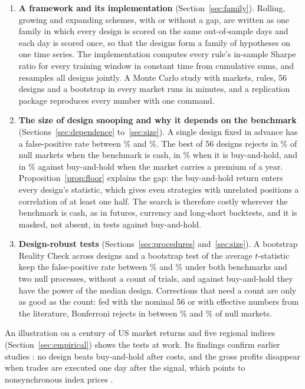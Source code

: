 \documentclass[pdflatex,sn-basic]{sn-jnl}
\theoremstyle{thmstyleone}
\theoremstyle{thmstylethree}
\begin{document}
\begin{enumerate}
\item \textbf{A framework and its implementation} (Section~\ref{sec:family}). Rolling, growing and
expanding schemes, with or without a gap, are written as one family in which every design is scored
on the same out-of-sample days and each day is scored once, so that the designs form a family of
hypotheses on one time series. The implementation computes every rule's in-sample Sharpe ratio for
every training window in constant time from cumulative sums, and resamples all designs jointly. A
Monte Carlo study with \NumNullReps{} markets, \NumRules{} rules, 56 designs and a bootstrap in
every market runs in minutes, and a replication package reproduces every number with one command.

\item \textbf{The size of design snooping and why it depends on the benchmark}
(Sections~\ref{sec:dependence} to~\ref{sec:size}). A single design fixed in advance has a
false-positive rate between \NumSizeSingleMin\% and \NumSizeSingleMax\%. The best of 56 designs
rejects in \NumSizeBestNaiveCash\% of null markets when the benchmark is cash, in
\NumSizeBestNaive\% when it is buy-and-hold, and in \NumSizeBestNaivePremium\% against buy-and-hold
when the market carries a premium of \NumPremium{} a year. Proposition~\ref{prop:floor} explains the
gap: the buy-and-hold return enters every design's statistic, which gives even
strategies with unrelated positions a correlation of at least one half. The search is therefore
costly wherever the benchmark is cash, as in futures, currency and long-short backtests, and it is
masked, not absent, in tests against buy-and-hold.

\item \textbf{Design-robust tests} (Sections~\ref{sec:procedures} and~\ref{sec:size}). A bootstrap
Reality Check across designs and a bootstrap test of the average $t$-statistic \citep{rossi2012}
keep the false-positive rate between \NumSizeRobustMin\% and \NumSizeRobustMax\% under both
benchmarks and two null processes, without a count of trials, and against buy-and-hold they have the
power of the median design. Corrections that need a count are only as good as the count: fed with the
nominal 56 or with effective numbers from the literature, Bonferroni rejects in between
\NumSizeBonf\% and \NumSizeBonfEff\% of null markets.
\end{enumerate}

An illustration on a century of US market returns and five regional indices (Section~\ref{sec:empirical})
shows the tests at work. Its findings confirm earlier studies \citep{sullivan1999,zakamulin2014,taylor2014}:
no design beats buy-and-hold after costs, and the gross profits disappear when trades are executed one
day after the signal, which points to nonsynchronous index prices
\citep{bessembinder1998,day2002,ready2002}.
\end{document}
